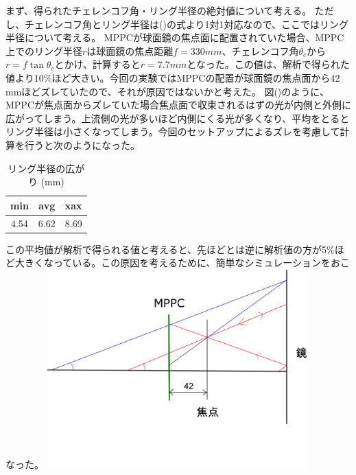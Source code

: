 \documentclass[uplatex, titlepage, dvipdfmx, 12pt, a4paper]{jsreport}
\begin{document}
    まず、得られたチェレンコフ角・リング半径の絶対値について考える。
    ただし、チェレンコフ角とリング半径は()の式より1対1対応なので、ここではリング半径について考える。
    MPPCが球面鏡の焦点面に配置されていた場合、MPPC上でのリング半径$r$は球面鏡の焦点距離$f=330 mm$、チェレンコフ角$\theta_{c}$から$r=f\tan{\theta_{c}}$とかけ、計算すると$r=7.7 mm$となった。この値は、解析で得られた値より10\%ほど大きい。今回の実験ではMPPCの配置が球面鏡の焦点面から42 mmほどズレていたので、それが原因ではないかと考えた。
    図()のように、MPPCが焦点面からズレていた場合焦点面で収束されるはずの光が内側と外側に広がってしまう。上流側の光が多いほど内側にくる光が多くなり、平均をとるとリング半径は小さくなってしまう。今回のセットアップによるズレを考慮して計算を行うと次のようになった。
    \begin{table}[htb]
        \begin{center}
            \caption{リング半径の広がり (mm)}
            \begin{tabular}{|c|c|c|}\hline
                min & avg & xax\\ \hline
                4.54 & 6.62 & 8.69\\ \hline
            \end{tabular}
        \end{center}
    \end{table}
    この平均値が解析で得られる値と考えると、先ほどとは逆に解析値の方が5\%ほど大きくなっている。この原因を考えるために、簡単なシミュレーションをおこなった。
    \includegraphics[width=10cm, pagebox=cropbox, clip]{image/optical_system.png}
\end{document}
